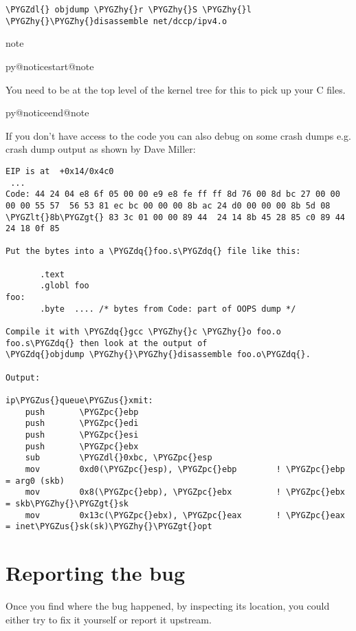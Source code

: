 \documentclass[a4paper,8pt,english]{sphinxmanual}
\makeatletter
\renewenvironment{notice}[2]{%
          \def\py@noticetype{#1}
          \begin{coloredbox}{#1}
          \bf\it
          \par\strong{#2}
          \csname py@noticestart@#1\endcsname
        }
	{
          \csname py@noticeend@\py@noticetype\endcsname
          \end{coloredbox}
        }
\def\PYGZus{\char`\_}
\def\PYGZlt{\char`\<}
\def\PYGZgt{\char`\>}
\def\PYGZpc{\char`\%}
\def\PYGZdl{\char`\$}
\def\PYGZhy{\char`\-}
\def\PYGZdq{\char`\"}
\makeatother
\begin{document}
\begin{Verbatim}[commandchars=\\\{\}]
\PYGZdl{} objdump \PYGZhy{}r \PYGZhy{}S \PYGZhy{}l \PYGZhy{}\PYGZhy{}disassemble net/dccp/ipv4.o
\end{Verbatim}

\begin{notice}{note}{Note:}
You need to be at the top level of the kernel tree for this to pick up
your C files.
\end{notice}

If you don't have access to the code you can also debug on some crash dumps
e.g. crash dump output as shown by Dave Miller:

\begin{Verbatim}[commandchars=\\\{\}]
EIP is at  +0x14/0x4c0
 ...
Code: 44 24 04 e8 6f 05 00 00 e9 e8 fe ff ff 8d 76 00 8d bc 27 00 00
00 00 55 57  56 53 81 ec bc 00 00 00 8b ac 24 d0 00 00 00 8b 5d 08
\PYGZlt{}8b\PYGZgt{} 83 3c 01 00 00 89 44  24 14 8b 45 28 85 c0 89 44 24 18 0f 85

Put the bytes into a \PYGZdq{}foo.s\PYGZdq{} file like this:

       .text
       .globl foo
foo:
       .byte  .... /* bytes from Code: part of OOPS dump */

Compile it with \PYGZdq{}gcc \PYGZhy{}c \PYGZhy{}o foo.o foo.s\PYGZdq{} then look at the output of
\PYGZdq{}objdump \PYGZhy{}\PYGZhy{}disassemble foo.o\PYGZdq{}.

Output:

ip\PYGZus{}queue\PYGZus{}xmit:
    push       \PYGZpc{}ebp
    push       \PYGZpc{}edi
    push       \PYGZpc{}esi
    push       \PYGZpc{}ebx
    sub        \PYGZdl{}0xbc, \PYGZpc{}esp
    mov        0xd0(\PYGZpc{}esp), \PYGZpc{}ebp        ! \PYGZpc{}ebp = arg0 (skb)
    mov        0x8(\PYGZpc{}ebp), \PYGZpc{}ebx         ! \PYGZpc{}ebx = skb\PYGZhy{}\PYGZgt{}sk
    mov        0x13c(\PYGZpc{}ebx), \PYGZpc{}eax       ! \PYGZpc{}eax = inet\PYGZus{}sk(sk)\PYGZhy{}\PYGZgt{}opt
\end{Verbatim}


\section{Reporting the bug}
\label{admin-guide/bug-hunting:reporting-the-bug}
Once you find where the bug happened, by inspecting its location,
you could either try to fix it yourself or report it upstream.
\end{document}
